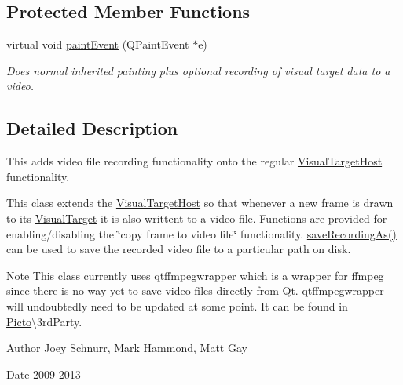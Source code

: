 \subsection*{Protected Member Functions}
\begin{DoxyCompactItemize}
\item 
\hypertarget{class_picto_1_1_recording_visual_target_host_ac636397e7740a51ad0ef9ffc3a899333}{virtual void \hyperlink{class_picto_1_1_recording_visual_target_host_ac636397e7740a51ad0ef9ffc3a899333}{paint\-Event} (Q\-Paint\-Event $\ast$e)}\label{class_picto_1_1_recording_visual_target_host_ac636397e7740a51ad0ef9ffc3a899333}

\begin{DoxyCompactList}\small\item\em Does normal inherited painting plus optional recording of visual target data to a video. \end{DoxyCompactList}\end{DoxyCompactItemize}


\subsection{Detailed Description}
This adds video file recording functionality onto the regular \hyperlink{class_picto_1_1_visual_target_host}{Visual\-Target\-Host} functionality. 

This class extends the \hyperlink{class_picto_1_1_visual_target_host}{Visual\-Target\-Host} so that whenever a new frame is drawn to its \hyperlink{class_picto_1_1_visual_target}{Visual\-Target} it is also writtent to a video file. Functions are provided for enabling/disabling the \char`\"{}copy frame to 
video file\char`\"{} functionality. \hyperlink{class_picto_1_1_recording_visual_target_host_ae08f1371672e8d376865b8e9ba2f9d22}{save\-Recording\-As()} can be used to save the recorded video file to a particular path on disk. \begin{DoxyNote}{Note}
This class currently uses qtffmpegwrapper which is a wrapper for ffmpeg since there is no way yet to save video files directly from Qt. qtffmpegwrapper will undoubtedly need to be updated at some point. It can be found in \hyperlink{namespace_picto}{Picto}\textbackslash{}3rd\-Party. 
\end{DoxyNote}
\begin{DoxyAuthor}{Author}
Joey Schnurr, Mark Hammond, Matt Gay 
\end{DoxyAuthor}
\begin{DoxyDate}{Date}
2009-\/2013 
\end{DoxyDate}


